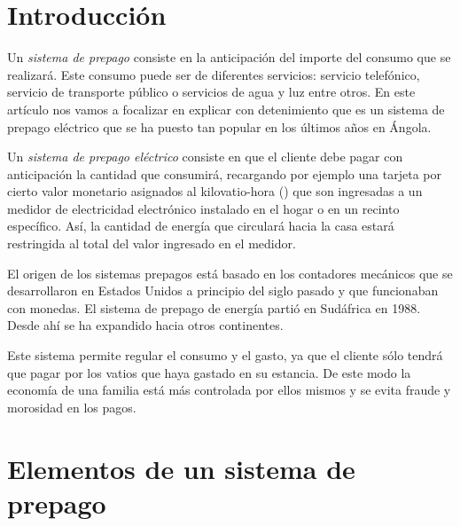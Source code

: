 \section{Introducción}


 Un {\sl sistema de prepago} consiste en la anticipación del importe del consumo que se realizará. Este consumo puede ser de diferentes servicios: servicio telefónico, servicio de transporte público o servicios de agua y luz entre otros. En este artículo nos vamos a focalizar en explicar con detenimiento que es un sistema de prepago eléctrico que se ha puesto tan popular en los últimos años en Ángola.

 Un {\sl sistema de prepago eléctrico} consiste en que el cliente debe pagar con anticipación la cantidad que consumirá, recargando por ejemplo una tarjeta por cierto valor monetario asignados al kilovatio-hora (\kilowatthour) que son ingresadas a un medidor de electricidad electrónico instalado en el hogar o en un recinto específico. Así, la cantidad de energía que circulará hacia la casa estará restringida al total del valor ingresado en el medidor. 

El origen de los sistemas prepagos está basado en los contadores mecánicos que se desarrollaron en Estados Unidos a principio del siglo pasado y que funcionaban con monedas. El sistema de prepago de energía partió en Sudáfrica en 1988. Desde ahí se ha expandido hacia otros continentes.

Este sistema permite regular el consumo y el gasto, ya que el cliente sólo tendrá que pagar por los vatios que haya gastado en su estancia. De este modo la economía de una familia está más controlada por ellos mismos y se evita fraude y morosidad en los pagos.

\section{Elementos de un sistema de prepago}

